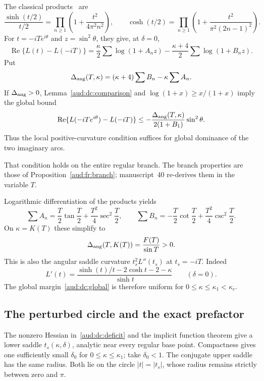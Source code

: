 \documentclass[11pt,a4paper]{article}
\numberwithin{equation}{section}
\begin{document}
The classical products~\cite{hyperbolic} are
\[
 \frac{\sinh(t/2)}{t/2}=\prod_{n\ge1}\left(1+\frac{t^2}{4\pi^2n^2}\right),
 \qquad
 \cosh(t/2)=\prod_{n\ge1}\left(1+\frac{t^2}{\pi^2(2n-1)^2}\right).
\]
For $t=-iT e^{i\theta}$ and $z=\sin^2\theta$, they give, at $\delta=0$,
\begin{equation}\label{aud:dc:modulus}
 \operatorname{Re}\{L(t)-L(-iT)\}
 =\frac\kappa2\sum\log(1+A_nz)
  -\frac{\kappa+4}{2}\sum\log(1+B_nz).
\end{equation}
Put
\[
 \Delta_{\rm ang}(T,\kappa)=(\kappa+4)\sum B_n-\kappa\sum A_n.
\]
If $\Delta_{\rm ang}>0$, Lemma~\ref{aud:dc:comparison} and $\log(1+x)\ge x/(1+x)$ imply the global bound
\begin{equation}\label{aud:dc:global}
 \operatorname{Re}\{L(-iTe^{i\theta})-L(-iT)\}
 \le-\frac{\Delta_{\rm ang}(T,\kappa)}{2(1+B_1)}\sin^2\theta.
\end{equation}
Thus the local positive-curvature condition suffices for global dominance of the two imaginary arcs.

That condition holds on the entire regular branch. The branch properties are those of Proposition~\ref{aud:fr:branch}; manuscript~40 re-derives them in the variable $T$.


Logarithmic differentiation of the products yields
\[
 \sum A_n=\frac T2\tan\frac T2+\frac{T^2}4\sec^2\frac T2,
 \qquad
 \sum B_n=-\frac T2\cot\frac T2+\frac{T^2}4\csc^2\frac T2.
\]
On $\kappa=K(T)$ these simplify to
\begin{equation}\label{aud:dc:deficit}
 \Delta_{\rm ang}(T,K(T))=\frac{F(T)}{\sin T}>0.
\end{equation}
This is also the angular saddle curvature $t_s^2L''(t_s)$ at $t_s=-iT$. Indeed
\[
 L'(t)=\frac{\sinh(t)/t-2\cosh t-2-\kappa}{\sinh t}
 \qquad(\delta=0).
\]
The global margin~\eqref{aud:dc:global} is therefore uniform for $0\le\kappa\le\kappa_1<\kappa_c$.

\subsection{The perturbed circle and the exact prefactor}
The nonzero Hessian in~\eqref{aud:dc:deficit} and the implicit function theorem give a lower saddle $t_s(\kappa,\delta)$, analytic near every regular base point. Compactness gives one sufficiently small $\delta_0$ for $0\le\kappa\le\kappa_1$; take $\delta_0<1$. The conjugate upper saddle has the same radius. Both lie on the circle $|t|=|t_s|$, whose radius remains strictly between zero and $\pi$.
\end{document}
